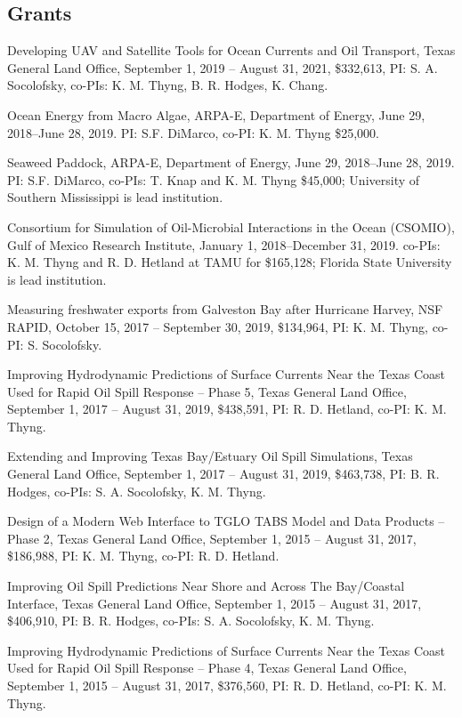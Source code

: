 \documentclass[10pt,letterpaper]{article}
\renewenvironment{itemize}{
  \begin{list}{}{
    \setlength{\leftmargin}{1.5em}
    \setlength{\itemsep}{0.25em}
    \setlength{\parskip}{0pt}
    \setlength{\parsep}{0.25em}
  }
}{
  \end{list}
}
\begin{document}
\subsection*{Grants}
\begin{itemize}
    \item Developing UAV and Satellite Tools for Ocean Currents and Oil Transport, Texas General Land Office, September 1, 2019 -- August 31, 2021, \$332,613, PI: S. A. Socolofsky, co-PIs: K. M. Thyng, B. R. Hodges, K. Chang.

    \item Ocean Energy from Macro Algae, ARPA-E, Department of Energy, June 29, 2018--June 28, 2019. PI: S.F. DiMarco, co-PI: K. M. Thyng \$25,000.

    \item Seaweed Paddock, ARPA-E, Department of Energy, June 29, 2018--June 28, 2019. PI: S.F. DiMarco, co-PIs: T. Knap and K. M. Thyng \$45,000; University of Southern Mississippi is lead institution.

\item Consortium for Simulation of Oil-Microbial Interactions in the Ocean (CSOMIO), Gulf of Mexico Research Institute, January 1, 2018--December 31, 2019. co-PIs: K. M. Thyng and R. D. Hetland at TAMU for \$165,128; Florida State University is lead institution.

  \item Measuring freshwater exports from Galveston Bay after Hurricane Harvey, NSF RAPID, October 15, 2017 -- September 30, 2019, \$134,964, PI: K. M. Thyng, co-PI: S. Socolofsky.

\item Improving Hydrodynamic Predictions of Surface Currents Near the Texas Coast Used for Rapid Oil Spill Response -- Phase 5, Texas General Land Office, September 1, 2017 -- August 31, 2019, \$438,591, PI: R. D. Hetland, co-PI: K. M. Thyng.
    \item Extending and Improving Texas Bay/Estuary Oil Spill Simulations, Texas        General Land Office, September 1, 2017 -- August 31, 2019, \$463,738, PI: B. R. Hodges, co-PIs: S. A. Socolofsky, K. M. Thyng.
  \item Design of a Modern Web Interface to TGLO TABS Model and Data Products -- Phase 2, Texas General Land Office, September 1, 2015 -- August 31, 2017, \$186,988, PI: K. M. Thyng, co-PI: R. D. Hetland.
  \item Improving Oil Spill Predictions Near Shore and Across The Bay/Coastal Interface, Texas General Land Office, September 1, 2015 -- August 31, 2017, \$406,910, PI: B. R. Hodges, co-PIs: S. A. Socolofsky, K. M. Thyng.
  \item Improving Hydrodynamic Predictions of Surface Currents Near the Texas Coast Used for Rapid Oil Spill Response -- Phase 4, Texas General Land Office, September 1, 2015 -- August 31, 2017, \$376,560, PI: R. D. Hetland, co-PI: K. M. Thyng.
\end{itemize}
\end{document}
